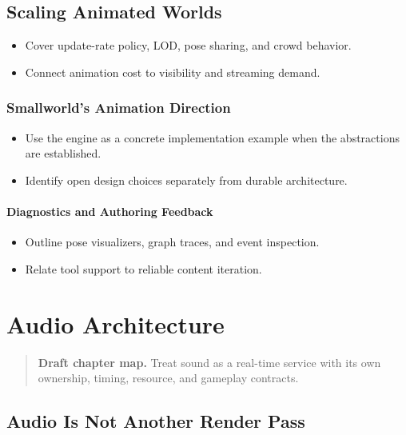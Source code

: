 \documentclass[
  11pt,
  letterpaper,
  DIV=11,
  numbers=noendperiod,
  twoside,
  open=right]{scrreprt}
\providecommand{\tightlist}{%
  \setlength{\itemsep}{0pt}\setlength{\parskip}{0pt}}
\begin{document}
\section{Scaling Animated Worlds}\label{scaling-animated-worlds}

\begin{itemize}
\tightlist
\item
  Cover update-rate policy, LOD, pose sharing, and crowd behavior.
\item
  Connect animation cost to visibility and streaming demand.
\end{itemize}

\subsection{Smallworld's Animation
Direction}\label{smallworlds-animation-direction}

\begin{itemize}
\tightlist
\item
  Use the engine as a concrete implementation example when the
  abstractions are established.
\item
  Identify open design choices separately from durable architecture.
\end{itemize}

\subsubsection{Diagnostics and Authoring
Feedback}\label{diagnostics-and-authoring-feedback}

\begin{itemize}
\tightlist
\item
  Outline pose visualizers, graph traces, and event inspection.
\item
  Relate tool support to reliable content iteration.
\end{itemize}

\chapter{Audio Architecture}\label{audio-architecture}

\begin{quote}
\textbf{Draft chapter map.} Treat sound as a real-time service with its
own ownership, timing, resource, and gameplay contracts.
\end{quote}

\section{Audio Is Not Another Render
Pass}\label{audio-is-not-another-render-pass}
\end{document}
